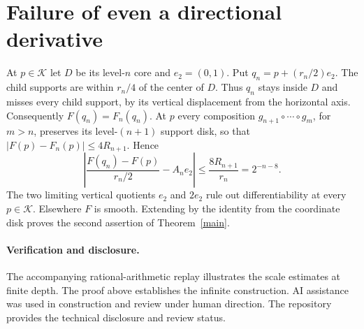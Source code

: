 \documentclass[11pt,a4paper]{amsart}
\newcommand{\Cset}{\mathcal K}
\begin{document}
\section{Failure of even a directional derivative}
At \(p\in\Cset\) let \(D\) be its level-\(n\) core and \(e_2=(0,1)\). Put \(q_n=p+(r_n/2)e_2\). The child supports are within \(r_n/4\) of the center of \(D\). Thus \(q_n\) stays inside \(D\) and misses every child support, by its vertical displacement from the horizontal axis. Consequently \(F(q_n)=F_n(q_n)\). At \(p\) every composition \(g_{n+1}\circ\cdots\circ g_m\), for \(m>n\), preserves its level-\((n+1)\) support disk, so that \(|F(p)-F_n(p)|\le4R_{n+1}\). Hence
\[
 \left|\frac{F(q_n)-F(p)}{r_n/2}-A_n e_2\right|
 \le\frac{8R_{n+1}}{r_n}=2^{-n-8}.
\]
The two limiting vertical quotients \(e_2\) and \(2e_2\) rule out differentiability at every \(p\in\Cset\). Elsewhere \(F\) is smooth. Extending by the identity from the coordinate disk proves the second assertion of Theorem~\ref{main}.

\paragraph{Verification and disclosure.}
The accompanying rational-arithmetic replay illustrates the scale estimates at finite depth. The proof above establishes the infinite construction. AI assistance was used in construction and review under human direction. The repository provides the technical disclosure and review status.


\end{document}
